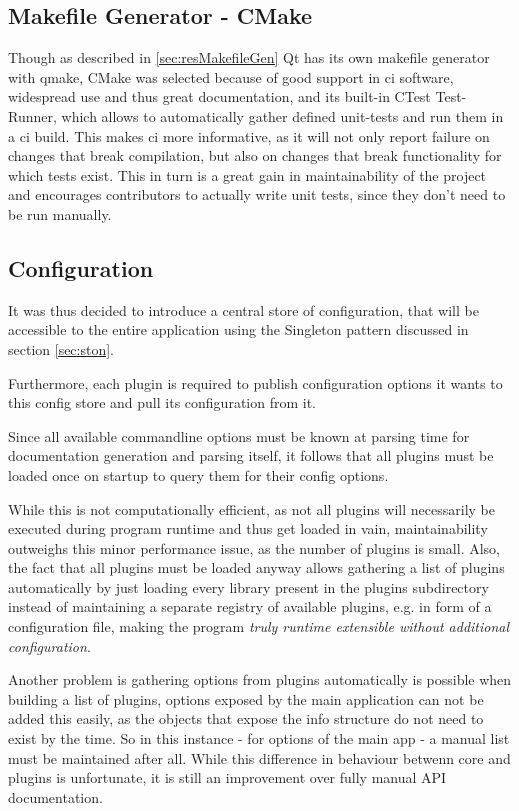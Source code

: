 \subsection{Makefile Generator - CMake}
Though as described in \ref{sec:resMakefileGen} Qt has its own makefile generator with qmake, CMake was selected because of good support in \gls{ci} software, widespread use and thus great documentation, and its built-in CTest Test-Runner, which allows to automatically gather defined unit-tests and run them in a \gls{ci} build. This makes \gls{ci} more informative, as it will not only report failure on changes that break compilation, but also on changes that break functionality for which tests exist. This in turn is a great gain in maintainability of the project and encourages contributors to actually write unit tests, since they don't need to be run manually.

\subsection{Configuration}
It was thus decided to introduce a central store of configuration, that will be accessible to the entire application using the Singleton pattern discussed in section \ref{sec:ston}.

Furthermore, each plugin is required to publish configuration options it wants to this config store and pull its configuration from it.

Since all available commandline options must be known at parsing time for documentation generation and parsing itself, it follows that all plugins must be loaded once on startup to query them for their config options.

While this is not computationally efficient, as not all plugins will necessarily be executed during program runtime and thus get loaded in vain, maintainability outweighs this minor performance issue, as the number of plugins is small. Also, the fact that all plugins must be loaded anyway allows gathering a list of plugins automatically by just loading every library present in the plugins subdirectory instead of maintaining a separate registry of available plugins, e.g. in form of a configuration file, making the program \emph{truly runtime extensible without additional configuration}.

Another problem is gathering options from plugins automatically is possible when building a list of plugins, options exposed by the main application can not be added this easily, as the objects that expose the info structure do not need to exist by the time. So in this instance - for options of the main app - a manual list must be maintained after all. While this difference in behaviour betwenn core and plugins is unfortunate, it is still an improvement over fully manual API documentation.

